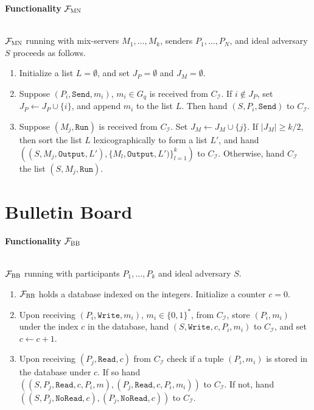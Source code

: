 \documentclass[a4paper]{article}
\newcommand{\F}{\mathcal{F}}
\begin{document}
\begin{framed}
    \centerline{\textbf{Functionality} $\F_{\textsc{MN}}$}
    \ \\
    \noindent $\F_{\textsc{MN}}$ running with mix-servers $M_1, \ldots, M_k$, senders $P_1, \ldots, P_N$, and ideal adversary $S$ proceeds as follows.
    
    \begin{enumerate}
        \item Initialize a list $L = \emptyset$, and set $J_P = \emptyset$ and $J_M = \emptyset$.
        \item Suppose $(P_i, \texttt{Send}, m_i)$, $m_i \in G_q$ is received from $C_\mathcal{I}$. If $i \not \in J_P$, set $J_P \leftarrow J_P \cup \{i\}$, and append $m_i$ to the list $L$. Then hand $(S, P_i, \texttt{Send})$ to $C_\mathcal{I}$.
        \item Suppose $(M_j, \texttt{Run})$ is received from $C_\mathcal{I}$. Set $J_M \leftarrow J_M \cup \{j\}$. If $|J_M| \geq k/2$, then sort the list $L$ lexicographically to form a list $L'$, and hand $((S, M_j, \texttt{Output}, L'), {\{M_l, \texttt{Output}, L')\}}^{k}_{l=1})$ to $C_\mathcal{I}$. Otherwise, hand $C_\mathcal{I}$ the list $(S, M_j, \texttt{Run})$.
    \end{enumerate}
\end{framed}

\section{Bulletin Board~\cite{wikstrom2004universally}}

\begin{framed}
    \centerline{\textbf{Functionality} $\F_{\textsc{BB}}$}
    \ \\
    \noindent $\F_{\textsc{BB}}$ running with participants $P_1, \ldots, P_k$ and ideal adversary $S$.
    
    \begin{enumerate}
        \item $\F_{\textsc{BB}}$ holds a database indexed on the integers. Initialize a counter $c = 0$.
        \item Upon receiving $(P_i, \texttt{Write}, m_i)$, $m_i \in {\{0, 1\}}^*$, from $C_\mathcal{I}$, store $(P_i, m_i)$ under the index $c$ in the database, hand $(S, \texttt{Write}, c, P_i, m_i)$ to $C_\mathcal{I}$, and set $c \leftarrow c + 1$.
        \item Upon receiving $(P_j, \texttt{Read}, c)$ from $C_\mathcal{I}$ check if a tuple $(P_i, m_i)$ is stored in the database under $c$. If so hand $((S, P_j, \texttt{Read}, c, P_i, m),(P_j, \texttt{Read}, c, P_i, m_i))$ to $C_\mathcal{I}$. If not, hand $((S, P_j, \texttt{NoRead},c), (P_j, \texttt{NoRead}, c))$ to $C_\mathcal{I}$.
    \end{enumerate}
\end{framed}
\end{document}

